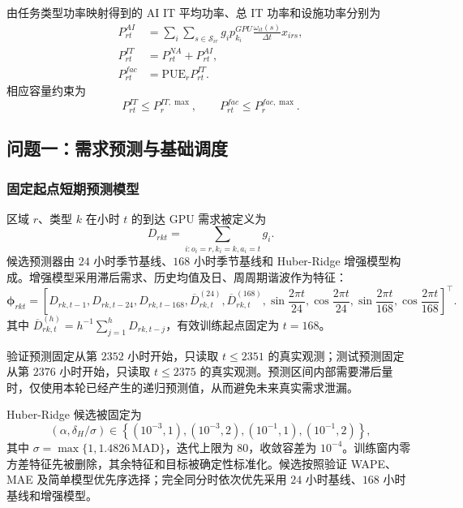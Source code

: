 由任务类型功率映射得到的 AI IT 平均功率、总 IT 功率和设施功率分别为
\begin{align}
P_{rt}^{AI}
&=\sum_i\sum_{s\in\mathcal S_{ir}}
g_ip_{k_i}^{GPU}
\frac{\omega_{it}(s)}{\Delta t}x_{irs},\\
P_{rt}^{IT}&=P_{rt}^{NA}+P_{rt}^{AI},\\
P_{rt}^{fac}&=\mathrm{PUE}_rP_{rt}^{IT}.
\end{align}
相应容量约束为
\begin{equation}
P_{rt}^{IT}\le P_r^{IT,\max},
\qquad
P_{rt}^{fac}\le P_r^{fac,\max}.
\label{eq:power-limit}
\end{equation}

\subsection{问题一：需求预测与基础调度}

\subsubsection{固定起点短期预测模型}

区域 $r$、类型 $k$ 在小时 $t$ 的到达 GPU 需求被定义为
\begin{equation}
D_{rkt}=\sum_{i:o_i=r,k_i=k,a_i=t}g_i.
\end{equation}
候选预测器由 $24$ 小时季节基线、$168$ 小时季节基线和 Huber-Ridge 增强模型构成。增强模型采用滞后需求、历史均值及日、周周期谐波作为特征：
\begin{equation}
\boldsymbol\phi_{rkt}=
\left[
D_{rk,t-1},D_{rk,t-24},D_{rk,t-168},
\overline D_{rk,t}^{(24)},\overline D_{rk,t}^{(168)},
\sin\frac{2\pi t}{24},\cos\frac{2\pi t}{24},
\sin\frac{2\pi t}{168},\cos\frac{2\pi t}{168}
\right]^\top .
\end{equation}
其中 $\overline D_{rk,t}^{(h)}=h^{-1}\sum_{j=1}^{h}D_{rk,t-j}$，有效训练起点固定为 $t=168$。

验证预测固定从第 $2352$ 小时开始，只读取 $t\le2351$ 的真实观测；测试预测固定从第 $2376$ 小时开始，只读取 $t\le2375$ 的真实观测。预测区间内部需要滞后量时，仅使用本轮已经产生的递归预测值，从而避免未来真实需求泄漏。

Huber-Ridge 候选被固定为
\begin{equation}
(\alpha,\delta_H/\sigma)\in
\left\{
(10^{-3},1),(10^{-3},2),(10^{-1},1),(10^{-1},2)
\right\},
\end{equation}
其中 $\sigma=\max\{1,1.4826\,\mathrm{MAD}\}$，迭代上限为 $80$，收敛容差为 $10^{-4}$。训练窗内零方差特征先被删除，其余特征和目标被确定性标准化。候选按照验证 WAPE、MAE 及简单模型优先序选择；完全同分时依次优先采用 $24$ 小时基线、$168$ 小时基线和增强模型。

